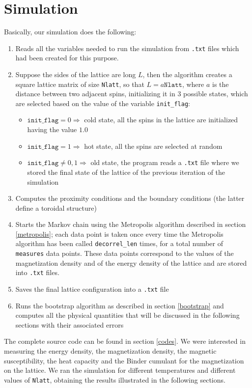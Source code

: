 \documentclass[11pt]{scrartcl} %
\begin{document}
\section{Simulation}
Basically, our simulation does the following:
\begin{enumerate}
	\item Reads all the variables needed to run the simulation from \texttt{.txt} files which had been created for this purpose.
	\item Suppose the sides of the lattice are long $L$, then the algorithm creates a square lattice matrix of size \texttt{Nlatt}, so that $L = a\mathtt{Nlatt}$, where $a$ is the distance between two adjacent spins, initializing it in 3 possible states, which are selected based on the value of the variable \texttt{init{\_}flag}:
	\begin{itemize}
		\item $\mathtt{init{\_}flag} = 0 \Rightarrow $ cold state, all the spins in the lattice are initialized having the value $1.0$
		\item $\mathtt{init{\_}flag} = 1 \Rightarrow $ hot state, all the spins are selected at random
		\item $\mathtt{init{\_}flag} \neq 0,1 \Rightarrow $ old state, the program reads a \texttt{.txt} file where we stored the final state of the lattice of the previous iteration of the simulation
	\end{itemize}
	\item Computes the proximity conditions and the boundary conditions (the latter define a toroidal structure)
	\item Starts the Markov chain using the Metropolis algorithm described in section \ref{metropolis}; each data point is taken once every time the Metropolis algorithm has been called \texttt{decorrel{\_}len} times, for a total number of \texttt{measures} data points. These data points correspond to the values of the magnetization density and of the energy density of the lattice and are stored into \texttt{.txt} files.
	\item Saves the final lattice configuration into a \texttt{.txt} file
	\item Runs the bootstrap algorithm as described in section \ref{bootstrap} and computes all the physical quantities that will be discussed in the following sections with their associated errors
\end{enumerate}
The complete source code can be found in section \ref{codes}. We were interested in measuring the energy density, the magnetization density, the magnetic susceptibility, the heat capacity and the Binder cumulant for the magnetization on the lattice. We ran the simulation for different temperatures and different values of \texttt{Nlatt}, obtaining the results illustrated in the following sections.
\end{document}
